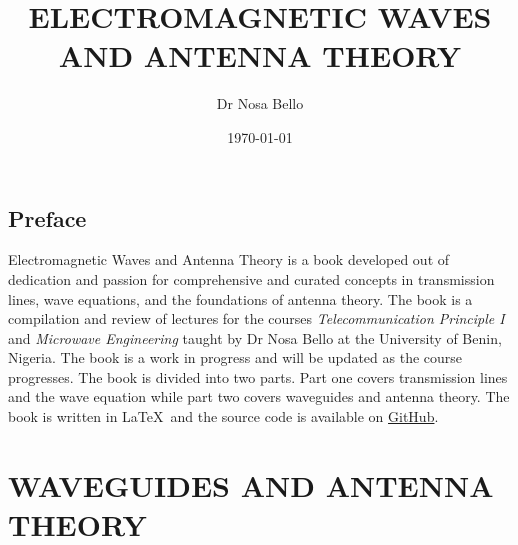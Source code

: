 \documentclass[a4paper,10pt, two column]{book}
\begin{document}
\author{Dr Nosa Bello}
\title{ELECTROMAGNETIC WAVES AND ANTENNA THEORY}
\date{\today}

\frontmatter
\maketitle
\tableofcontents

\chapter{Preface}
Electromagnetic Waves and Antenna Theory is a book developed out of dedication and passion for comprehensive and curated concepts in transmission lines, wave equations, and the foundations of antenna theory. The book is a compilation and review of lectures for the courses \textit{Telecommunication Principle I} and \textit{Microwave Engineering} taught by Dr Nosa Bello at the University of Benin, Nigeria. The book is a work in progress and will be updated as the course progresses. The book is divided into two parts. Part one covers transmission lines and the wave equation while part two covers waveguides and antenna theory. The book is written in \LaTeX\ and the source code is available on \href{https://github.com/allisonoge/electromagnetism-and-antenna-theory-v2.git}{GitHub}.

\mainmatter

\part{WAVEGUIDES AND ANTENNA THEORY}



















% 
% 
% 
% 
% 
% 
% 
% 
% 
% 

\backmatter
\printindex

\shipoutAnswer
\end{document}
